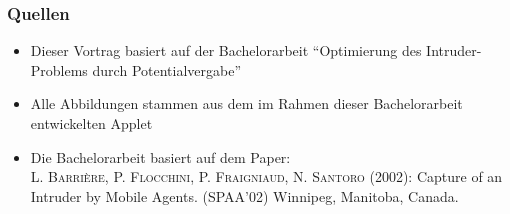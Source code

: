 \documentclass{beamer}
\begin{document}
	
	\begin{frame}
		\frametitle{Quellen}
		\large
		
		\begin{itemize}
			\item Dieser Vortrag basiert auf der Bachelorarbeit "`Optimierung des Intruder-Problems durch Potentialvergabe"'
			
			\item Alle Abbildungen stammen aus dem im Rahmen dieser Bachelorarbeit entwickelten Applet
			
			\item Die Bachelorarbeit basiert auf dem Paper:\\
					\textsc{L. Barrière, P. Flocchini, P. Fraigniaud, N. Santoro} (2002): Capture of an Intruder by Mobile Agents. (SPAA'02) Winnipeg, Manitoba, Canada.
		\end{itemize}
		
	\end{frame}
	
	
%
%		
%		
%		
%		
%		
%		
%		
%
%		

	
\end{document}
